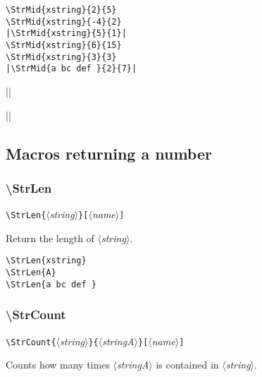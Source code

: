 \documentclass[a4paper,10pt]{article}
\newcommand\argu[1]{$\langle$\textit{#1}$\rangle$}
\newcommand\ARGU[1]{\texttt{\{}\argu{#1}\texttt{\}}}
\newcommand\arguC[1]{\texttt{[}\argu{#1}\texttt{]}}
\newcommand\styleexemple{\small\vskip4pt}
\newcommand\verbinline{\lstinline[basicstyle=\normalsize\ttfamily]}
\begin{document}
\begin{minipage}[t]{0.65\linewidth}
\begin{lstlisting}
\StrMid{xstring}{2}{5}
\StrMid{xstring}{-4}{2}
|\StrMid{xstring}{5}{1}|
\StrMid{xstring}{6}{15}
\StrMid{xstring}{3}{3}
|\StrMid{a bc def }{2}{7}|
\end{lstlisting}%
\end{minipage}\hfill
\begin{minipage}[t]{0.35\linewidth}
	\styleexemple
	\par
	\par
	||\par
	\par
	\par
	||
\end{minipage}%

\subsection{Macros returning a number}
\subsubsection{\ttfamily\textbackslash StrLen}

\verbinline|\StrLen|\ARGU{string}\arguC{name}
\smallskip

Return the length of \argu{string}.

\begin{minipage}[t]{0.65\linewidth}
\begin{lstlisting}
\StrLen{xstring}
\StrLen{A}
\StrLen{a bc def }
\end{lstlisting}%
\end{minipage}\hfill
\begin{minipage}[t]{0.35\linewidth}
	\styleexemple
	\par
	\par
\end{minipage}%

\subsubsection{\ttfamily\textbackslash StrCount}

\verbinline|\StrCount|\ARGU{string}\ARGU{stringA}\arguC{name}
\smallskip

Counts how many times \argu{stringA} is contained in \argu{string}.\par\medskip
\end{document}
